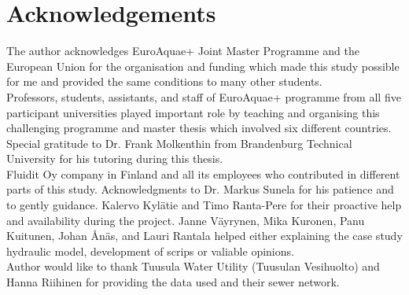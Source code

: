 \chapter*{Acknowledgements}

The author acknowledges EuroAquae+ Joint Master Programme and the European Union for the organisation and funding which made this study possible for me and provided the same conditions to many other students.\\

\noindent
Professors, students, assistants, and staff of EuroAquae+ programme from all five participant universities played important role by teaching and organising this challenging programme and master thesis which involved six different countries. Special gratitude to Dr. Frank Molkenthin from Brandenburg Technical University for his tutoring during this thesis.\\

\noindent
Fluidit Oy company in Finland and all its employees who contributed in different parts of this study. Acknowledgments to Dr. Markus Sunela for his patience and to gently guidance. Kalervo Kylätie and Timo Ranta-Pere for their proactive help and availability during the project. Janne Väyrynen, Mika Kuronen, Panu Kuitunen, Johan Ånäs, and Lauri Rantala helped either explaining the case study hydraulic model, development of scrips or valiable opinions.\\

\noindent
Author would like to thank Tuusula Water Utility (Tuusulan Vesihuolto) and Hanna Riihinen for providing the data used and their sewer network.
